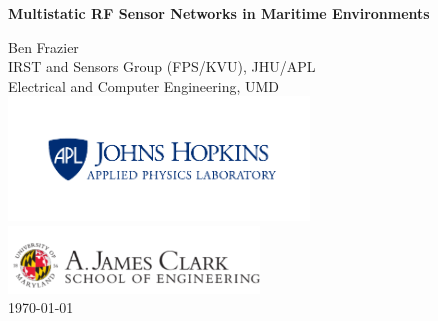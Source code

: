 \titlepage
\begin{center}
\vspace*{25pt}
{\huge \bfseries Multistatic RF Sensor Networks in Maritime Environments\\}

\vspace{100 pt}

\large Ben Frazier \\
 \small IRST and Sensors Group (FPS/KVU), JHU/APL \\
 \small Electrical and Computer Engineering, UMD \\
\includegraphics[width=0.6\textwidth]{../media/apl_small_horizontal_blue} \\
\includegraphics[width=0.5\textwidth]{../media/clark}\\
\vspace{75pt}
\large \today
\end{center}